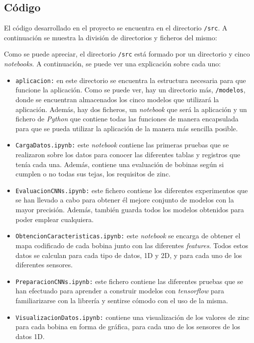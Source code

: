 \subsection{Código}
El código desarrollado en el proyecto se encuentra en el directorio \texttt{/src}. A continuación se muestra la división de directorios y ficheros del mismo:

Como se puede apreciar, el directorio \texttt{/src} está formado por un directorio y cinco \emph{notebooks}. A continuación, se puede ver una explicación sobre cada uno:

\begin{itemize}
    \item \texttt{aplicacion:} en este directorio se encuentra la estructura necesaria para que funcione la aplicación. Como se puede ver, hay un directorio más, \texttt{/modelos}, donde se encuentran almacenados los cinco modelos que utilizará la aplicación. Además, hay dos ficheros, un \emph{notebook} que será la aplicación y un fichero de \emph{Python} que contiene todas las funciones de manera encapsulada para que se pueda utilizar la aplicación de la manera más sencilla posible.
    \item \texttt{CargaDatos.ipynb:} este \emph{notebook} contiene las primeras pruebas que se realizaron sobre los datos para conocer las diferentes tablas y registros que tenía cada una. Además, contiene una evaluación de bobinas según si cumplen o no todas sus tejas, los requisitos de zinc.
    \item \texttt{EvaluacionCNNs.ipynb:} este fichero contiene los diferentes experimentos que se han llevado a cabo para obtener él mejore conjunto de modelos con la mayor precisión. Además, también guarda todos los modelos obtenidos para poder emplear cualquiera.
    \item \texttt{ObtencionCaracteristicas.ipynb:} este \emph{notebook} se encarga de obtener el mapa codificado de cada bobina junto con las diferentes \emph{features}. Todos estos datos se calculan para cada tipo de datos, 1D y 2D, y para cada uno de los diferentes sensores.
    \item \texttt{PreparacionCNNs.ipynb:} este fichero contiene las diferentes pruebas que se han efectuado para aprender a construir modelos con \emph{tensorflow} para familiarizarse con la librería y sentirse cómodo con el uso de la misma.
    \item \texttt{VisualizacionDatos.ipynb:} contiene una visualización de los valores de zinc para cada bobina en forma de gráfica, para cada uno de los sensores de los datos 1D.
\end{itemize}

